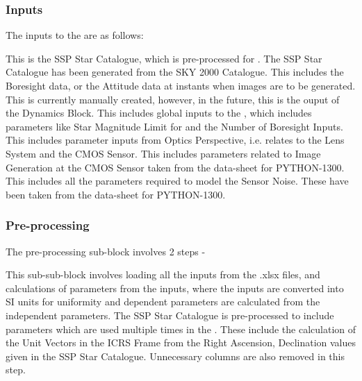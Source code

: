 \documentclass[../../main.tex]{subfiles}
\begin{document}
\newpage
\subsubsection{Inputs}
The inputs to the \SISM are as follows:
\begin{enumerate}[label={}]
     This is the SSP Star Catalogue, which is pre-processed for \SIS. The SSP Star Catalogue has been generated from the SKY 2000 Catalogue. 
     This includes the Boresight data, or the Attitude data at instants when images are to be generated. This is currently manually created, however, in the future, this is the ouput of the Dynamics Block.
     This includes global inputs to the \SISM, which includes parameters like Star Magnitude Limit for \SISM and the Number of Boresight Inputs. 
     This includes parameter inputs from Optics Perspective, i.e. relates to the Lens System and the CMOS Sensor.
     This includes parameters related to Image Generation at the CMOS Sensor taken from the data-sheet for PYTHON-1300.
     This includes all the parameters required to model the Sensor Noise. These have been taken from the data-sheet for PYTHON-1300.
\end{enumerate}


\subsubsection{Pre-processing} %
The pre-processing sub-block involves 2 steps -
\begin{enumerate}[label={}]
     This sub-sub-block involves loading all the inputs from the .xlsx files, and calculations of parameters from the inputs, where the inputs are converted into SI units for uniformity and dependent parameters are calculated from the independent parameters. 
     The SSP Star Catalogue is pre-processed to include parameters which are used multiple times in the \SIS. These include the calculation of the Unit Vectors in the ICRS Frame from the Right Ascension, Declination values given in the SSP Star Catalogue. Unnecessary columns are also removed in this step. 
\end{enumerate}
\end{document}
